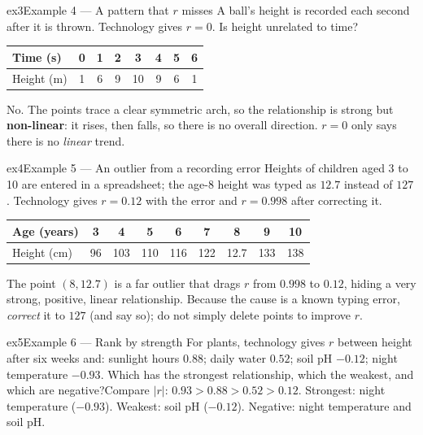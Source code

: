 \documentclass[11pt]{article}
\begin{document}
\begin{example}{ex3}{Example 4 --- A pattern that $r$ misses}
A ball's height is recorded each second after it is thrown. Technology gives $r=0$. Is height unrelated to time?\begin{center}\footnotesize\begin{tabular}{|l|*{7}{c|}}\hline Time (s) & 0 & 1 & 2 & 3 & 4 & 5 & 6 \\ \hline Height (m) & 1 & 6 & 9 & 10 & 9 & 6 & 1 \\ \hline\end{tabular}\end{center}\soln No. The points trace a clear symmetric arch, so the relationship is strong but \textbf{non-linear}: it rises, then falls, so there is no overall direction. $r=0$ only says there is no \emph{linear} trend.
\end{example}

\begin{example}{ex4}{Example 5 --- An outlier from a recording error}
Heights of children aged 3 to 10 are entered in a spreadsheet; the age-8 height was typed as $12.7$ instead of $127$. Technology gives $r=0.12$ with the error and $r=0.998$ after correcting it.\begin{center}\footnotesize\begin{tabular}{|l|*{8}{c|}}\hline Age (years) & 3 & 4 & 5 & 6 & 7 & 8 & 9 & 10 \\ \hline Height (cm) & 96 & 103 & 110 & 116 & 122 & 12.7 & 133 & 138 \\ \hline\end{tabular}\end{center}\soln The point $(8,12.7)$ is a far outlier that drags $r$ from $0.998$ to $0.12$, hiding a very strong, positive, linear relationship. Because the cause is a known typing error, \emph{correct} it to $127$ (and say so); do not simply delete points to improve $r$.
\end{example}

\begin{example}{ex5}{Example 6 --- Rank by strength}
For plants, technology gives $r$ between height after six weeks and: sunlight hours $0.88$; daily water $0.52$; soil pH $-0.12$; night temperature $-0.93$. Which has the strongest relationship, which the weakest, and which are negative?\soln Compare $|r|$: $0.93>0.88>0.52>0.12$. Strongest: night temperature ($-0.93$). Weakest: soil pH ($-0.12$). Negative: night temperature and soil pH.
\end{example}
\end{document}
